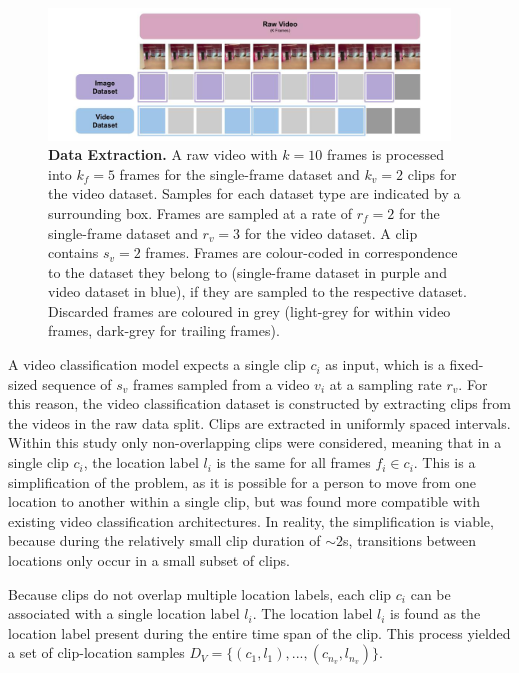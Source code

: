 \documentclass[a4paper]{article}
\begin{document}
\begin{figure}
\centering
\includegraphics[width=0.95\textwidth]{figures/data-extraction.png}
\caption{
  \textbf{Data Extraction.} A raw video with $k=10$ frames is processed into
  $k_f=5$ frames for the single-frame dataset and $k_v=2$ clips for the
  video dataset. Samples for each dataset type are indicated by a
  surrounding box. Frames are sampled at a rate of $r_f=2$ for the
  single-frame dataset and $r_v=3$ for the video dataset. A clip contains
  $s_v=2$ frames. Frames are colour-coded in correspondence to the dataset
  they belong to (single-frame dataset in purple and video dataset in blue),
  if they are sampled to the respective dataset. Discarded frames are
  coloured in grey (light-grey for within video frames, dark-grey for
  trailing frames).}
\label{fig:data-extraction}
\end{figure}


A video classification model expects a single clip $c_i$ as input, which is a
fixed-sized sequence of $s_v$ frames sampled from a video $v_i$ at a sampling
rate $r_v$. For this reason, the video classification dataset is constructed by
extracting clips from the videos in the raw data split. Clips are extracted in
uniformly spaced intervals. Within this study only non-overlapping clips were
considered, meaning that in a single clip $c_i$, the location label $l_i$ is the
same for all frames $f_i \in c_i$. This is a simplification of the problem, as
it is possible for a person to move from one location to another within a single
clip, but was found more compatible with existing video classification
architectures. In reality, the simplification is viable, because during the
relatively small clip duration of $\sim 2$s, transitions between locations only
occur in a small subset of clips.

Because clips do not overlap multiple location labels, each clip $c_i$ can be
associated with a single location label $l_i$. The location label $l_i$ is found
as the location label present during the entire time span of the clip. This
process yielded a set of clip-location samples $D_V = \{(c_1, l_1), ...,
(c_{n_v}, l_{n_v})\}$.
\end{document}
